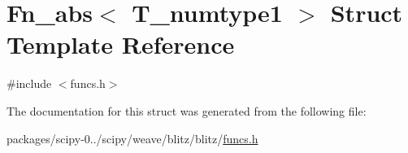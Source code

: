 \hypertarget{structFn__abs}{}\section{Fn\+\_\+abs$<$ T\+\_\+numtype1 $>$ Struct Template Reference}
\label{structFn__abs}


{\ttfamily \#include $<$funcs.\+h$>$}



The documentation for this struct was generated from the following file\+:\begin{DoxyCompactItemize}
\item 
packages/scipy-\/0../scipy/weave/blitz/blitz/\hyperlink{funcs_8h}{funcs.\+h}\end{DoxyCompactItemize}
